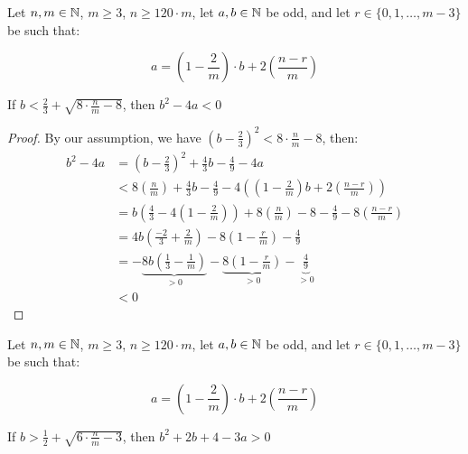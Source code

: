%
%

\begin{lemma}
    \label{lem:b2leq4a}
    
    Let $n,m\in \mathbb{N}$, $m\geq 3$, $n\geq 120\cdot m$, let $a,b\in\mathbb{N}$ be odd, and let $r\in\{0,1,\dots,m-3\}$ be such that:

    \[
        a=\left(1-\frac{2}{m}\right)\cdot b + 2\left(\frac{n-r}{m}\right)
    \]

    If $b<\frac{2}{3} + \sqrt{8\cdot\frac{n}{m} - 8}$, then $b^2-4a<0$
\end{lemma}

\begin{proof}
    By our assumption, we have $\left(b-\frac{2}{3}\right)^2 < 8\cdot\frac{n}{m} - 8$, then:
    \begin{align}
        b^2-4a &= \left(b-\frac{2}{3}\right)^2 + \frac{4}{3}b - \frac{4}{9} - 4a \\
        &<8\left(\frac{n}{m}\right) + \frac{4}{3}b - \frac{4}{9} - 4\left(\left(1-\frac{2}{m}\right)b + 2\left(\frac{n-r}{m}\right)\right) \\
        &= b\left(\frac{4}{3} - 4\left(1-\frac{2}{m}\right)\right) + 8\left(\frac{n}{m}\right) - 8 - \frac{4}{9} - 8\left(\frac{n-r}{m}\right) \\
        &= 4b\left(\frac{-2}{3} +\frac{2}{m}\right) - 8\left(1 - \frac{r}{m}\right) - \frac{4}{9} \\
        &= -\underbrace{8b\left(\frac{1}{3} -\frac{1}{m}\right)}_{>0} - \underbrace{8\left(1 - \frac{r}{m}\right)}_{>0} - \underbrace{\frac{4}{9}}_{>0} \\
        &<0
    \end{align}
\end{proof}

%
%

\begin{lemma}
    \label{lem:b22b43a}
    
    Let $n,m\in \mathbb{N}$, $m\geq 3$, $n\geq 120\cdot m$, let $a,b\in\mathbb{N}$ be odd, and let $r\in\{0,1,\dots,m-3\}$ be such that:

    \[
        a=\left(1-\frac{2}{m}\right)\cdot b + 2\left(\frac{n-r}{m}\right)
    \]

    If $b>\frac{1}{2} + \sqrt{6\cdot\frac{n}{m} - 3}$, then $b^2+2b+4-3a>0$
\end{lemma}

